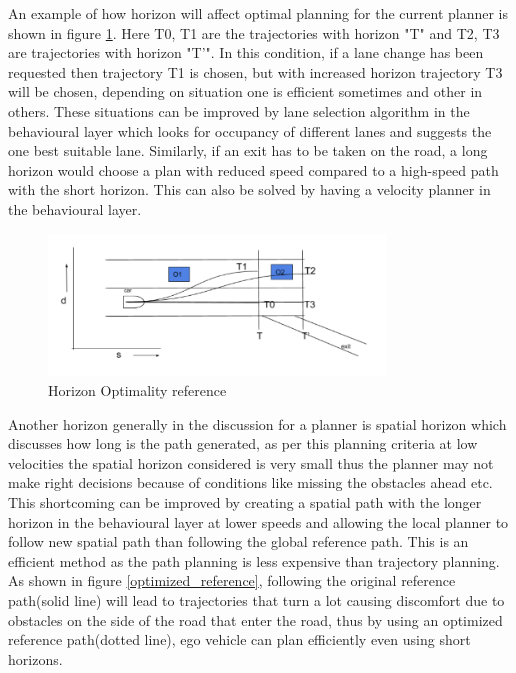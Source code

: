 An example of how horizon will affect optimal planning for the current planner is shown in figure \ref{horizon_optimality}. Here T0, T1 are the trajectories with horizon "T" and T2, T3 are trajectories with horizon "T'". In this condition, if a lane change has been requested then trajectory T1 is chosen, but with increased horizon trajectory T3 will be chosen, depending on situation one is efficient sometimes and other in others. These situations can be improved by lane selection algorithm in the behavioural layer which looks for occupancy of different lanes and suggests the one best suitable lane. Similarly, if an exit has to be taken on the road, a long horizon would choose a plan with reduced speed compared to a high-speed path with the short horizon. This can also be solved by having a velocity planner in the behavioural layer.  

\begin{figure}[h]
    \centering
    \includegraphics[width=0.8\textwidth]{Images/horizaon_optimality_2.png}
    \caption{Horizon Optimality reference}
    \label{horizon_optimality}
\end{figure}
 
 Another horizon generally in the discussion for a planner is spatial horizon which discusses how long is the path generated, as per this planning criteria at low velocities the spatial horizon considered is very small thus the planner may not make right decisions because of conditions like missing the obstacles ahead etc. This shortcoming can be improved by creating a spatial path with the longer horizon in the behavioural layer at lower speeds and allowing the local planner to follow new spatial path than following the global reference path. This is an efficient method as the path planning is less expensive than trajectory planning. As shown in figure \ref{optimized_reference}, following the original reference path(solid line) will lead to trajectories that turn a lot causing discomfort due to obstacles on the side of the road that enter the road, thus by using an optimized reference path(dotted line), ego vehicle can plan efficiently even using short horizons.


